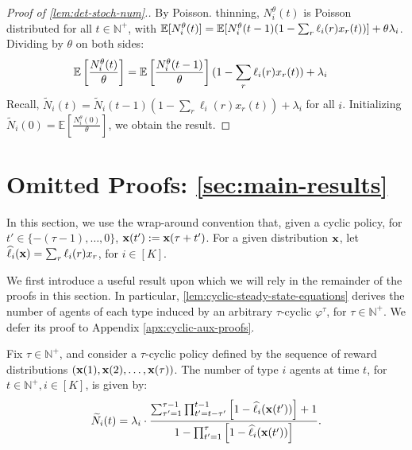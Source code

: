 \documentclass[12pt]{article}
\begin{document}
\begin{proof}[Proof of \cref{lem:det-stoch-num}.]
By Poisson. thinning, $N_i^\theta(t)$ is Poisson distributed for all $t\in\mathbb{N}^+$, with $\mathbb{E}[N_i^\theta(t)] = \mathbb{E}[N_i^\theta(t-1)(1-\sum_r\ell_i(r)x_r(t))] + \theta\lambda_i$. Dividing by $\theta$ on both sides:
\begin{align*}
   \mathbb{E}\left[\frac{N_i^\theta(t)}{\theta}\right] &= \mathbb{E}\left[\frac{N_i^\theta(t-1)}{\theta}\right](1-\sum_r\ell_i(r)x_r(t)) + \lambda_i 
\end{align*}
Recall, $\widetilde{N}_i(t) = \widetilde{N}_i(t-1)(1-\sum_r \ell_i(r)x_r(t)) + \lambda_i$ for all $i$. Initializing $\widetilde{N}_i(0) = \mathbb{E}\left[\frac{N_i^\theta(0)}{\theta}\right]$, we obtain the result.
\end{proof}




\section{Omitted Proofs: \cref{sec:main-results}}

In this section, we use the wrap-around convention that, given a cyclic policy, for $t' \in \{-(\tau-1),\ldots,0\}$, $\mathbf{x}(t') := \mathbf{x}(\tau+t')$. For a given distribution $\mathbf{x}$, let $\widehat{\ell}_i(\mathbf{x}) = \sum_r \ell_i(r) x_r$, for $i \in [K]$.  

We first introduce a useful result upon which we will rely in the remainder of the proofs in this section. In particular, \cref{lem:cyclic-steady-state-equations} derives the number of agents of each type induced by an arbitrary $\tau$-cyclic $\varphi^\tau$, for $\tau \in \mathbb{N}^+$. We defer its proof to Appendix \ref{apx:cyclic-aux-proofs}.

\begin{proposition}\label{lem:cyclic-steady-state-equations}
Fix $\tau \in \mathbb{N}^+$, and consider a $\tau$-cyclic policy defined by the sequence of reward distributions $(\mathbf{x}(1), \mathbf{x}(2),\ldots,\mathbf{x}(\tau))$. The  number of type $i$ agents at time $t$, for $t \in \mathbb{N}^+, i \in [K]$, is given by:
\begin{align}\label{eq:lem-cyclic-steady-state-equations}
    \widetilde{N}_i(t) = \lambda_i \cdot \frac{\sum_{\tau' = 1}^{\tau-1} \prod_{t'=t-\tau'}^{t-1}\left[1-\widehat{\ell}_i(\mathbf{x}(t'))\right] + 1}{1-\prod_{t'=1}^\tau \left[1-\widehat{\ell}_i(\mathbf{x}(t'))\right]}.
\end{align}
\end{proposition}
\end{document}
